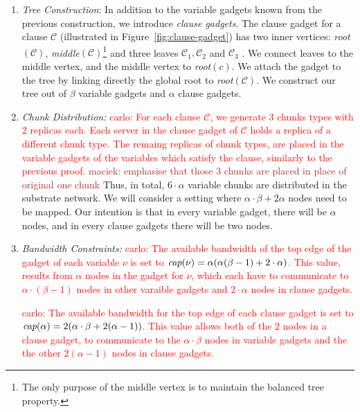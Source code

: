 \documentclass[9pt]{sigcomm-alternate}
\newcommand{\carlo}[1]{\textcolor{red}{carlo: #1}}
\newcommand{\maciek}[1]{\textcolor{brown}{maciek: #1}}
\newcommand{\variab}{\nu}
\newcommand{\clauses}{\alpha}
\newcommand{\vars}{\beta}
\newcommand{\variables}{\beta}
\newcommand{\capa}{\emph{cap}}
\begin{document}
\begin{appendix}
\begin{enumerate}
  \item \emph{Tree Construction}: In addition to the variable gadgets known from the
  previous construction, we introduce \emph{clause
    gadgets}. The clause gadget for a clause $\mathcal{C}$ (illustrated in
Figure~\ref{fig:clause-gadget})
    has two inner vertices:
    \emph{root}$(\mathcal{C})$, \emph{middle}$(\mathcal{C})$\footnote{The only
purpose of the middle vertex is to maintain the balanced tree property.} and
three leaves $\mathcal{C}_1,\mathcal{C}_2$ and $\mathcal{C}_3$ . We connect
leaves to the
    middle vertex, and the middle vertex to \emph{root}$(c)$. We attach the
    gadget to the tree by linking directly the global root to
    \emph{root}$(\mathcal{C})$. We construct our tree out of $\vars$ variable
gadgets
    and $\clauses$ clause gadgets.
  \item \emph{Chunk Distribution:}
  \carlo{For each clause $\mathcal{C}$, we generate $3$ chunks types with $2$
replicas each. Each server in the
clause gadget of $\mathcal{C}$ holds a replica of a different chunk type. The
remaing replicas of chunk types, are placed in the variable gadgets of the
variables which satisfy the clause, similarly to the previous proof. \maciek{emphasise that those 3 chunks are placed in place of original one chunk} }
Thus, in total, $6 \cdot \clauses$ variable chunks are
distributed in the substrate network.  We will consider a setting where
$\clauses \cdot \vars +
2\clauses$ nodes need to be mapped. Our intention is that in every
variable gadget, there will be $\clauses$ nodes, and in every clause
gadgets there will be two nodes.

  \item \emph{Bandwidth Constraints:}
\carlo{The available bandwidth of the top edge of the gadget of each
variable $\variab$ is set to
$\capa(\variab) = \clauses  (\clauses(\variables -1) + 2  \cdot
 \clauses)$.
This value, results from $\clauses$ nodes in the gadget for $\variab$,
which each have to communicate to $\clauses \cdot (\variables -1)$ nodes in
other varaible gadgets and $2\cdot \clauses$ nodes in clause gadgets.}

\carlo{The available bandwidth for the top edge of each clause gadget is set to
$\capa(\clauses) = 2 (\clauses \cdot  \variables + 2(\clauses -1)) $. This
value allows both of the $2$ nodes in a clause gadget, to communicate to the
$\clauses \cdot \variables$ nodes in variable gadgets and the the other
$2(\clauses -1)$ nodes in clause gadgets.}



\end{enumerate}
\end{appendix}
\end{document}
